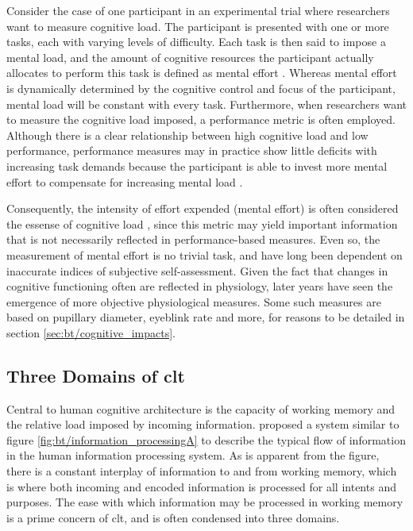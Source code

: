 Consider the case of one participant in an experimental trial where researchers want to measure cognitive load. The participant is presented with one or more tasks, each with varying levels of difficulty. Each task is then said to impose a mental load, and the amount of cognitive resources the participant actually allocates to perform this task is defined as mental effort \cite{paas1994B}. Whereas mental effort is dynamically determined by the cognitive control and focus of the participant, mental load will be constant with every task. Furthermore, when researchers want to measure the cognitive load imposed, a performance metric is often employed. Although there is a clear relationship between high cognitive load and low performance, performance measures may in practice show little deficits with increasing task demands because the participant is able to invest more mental effort to compensate for increasing mental load \cite{tulga1980}.

Consequently, the intensity of effort expended (mental effort) is often considered the essense of cognitive load \cite{hamilton1979}, since this metric may yield important information that is not necessarily reflected in performance-based measures. Even so, the measurement of mental effort is no trivial task, and have long been dependent on inaccurate indices of subjective self-assessment. Given the fact that changes in cognitive functioning often are reflected in physiology, later years have seen the emergence of more objective physiological measures. Some such measures are based on pupillary diameter, eyeblink rate and more, for reasons to be detailed in section \ref{sec:bt/cognitive_impacts}.

\subsection{Three Domains of \acrlong{clt}}



Central to human cognitive architecture is the capacity of working memory and the relative load imposed by incoming information. \textcite{sweller1988} proposed a system similar to figure \ref{fig:bt/information_processingA} to describe the typical flow of information in the human information processing system. As is apparent from the figure, there is a constant interplay of information to and from working memory, which is where both incoming and encoded information is processed for all intents and purposes. The ease with which information may be processed in working memory is a prime concern of \acrshort{clt}, and is often condensed into three domains.

